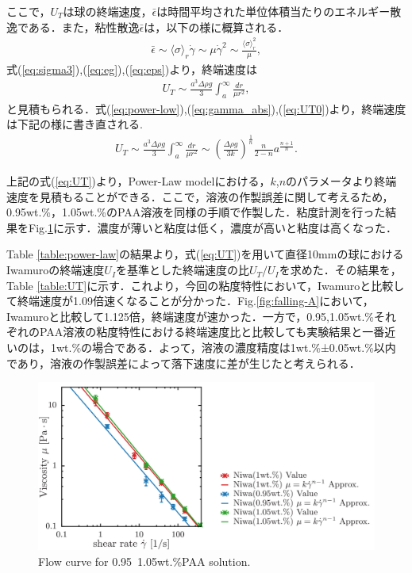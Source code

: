 ここで，$U_T$は球の終端速度，$\bar{\epsilon}$は時間平均された単位体積当たりのエネルギー散逸である．また，粘性散逸$\bar{\epsilon}$は，以下の様に概算される．
\begin{eqnarray}
    \bar{\epsilon} \sim \langle\sigma\rangle_r\dot{\gamma} \sim \mu \dot{\gamma}^2 \sim \frac{\langle\sigma\rangle_r^2}{\mu} ,
    \label{eq:eps}
\end{eqnarray}
式(\ref{eq:sigma3}),(\ref{eq:eg}),(\ref{eq:eps})より，終端速度は
\begin{eqnarray}
    U_T \sim \frac{a^3\Delta\rho g}{3}\int_a^\infty\frac{dr}{\mu r^2} ,
    \label{eq:UT0}
\end{eqnarray}
と見積もられる．式(\ref{eq:power-low}),(\ref{eq:gamma_abs}),(\ref{eq:UT0})より，終端速度は下記の様に書き直される.
\begin{eqnarray}
    U_T \sim \frac{a^3\Delta\rho g}{3}  \int^{\infty}_{a} \frac{dr}{\mu r^2} \sim \left(\frac{\Delta \rho g}{3k}\right)^{\frac{1}{n}}\frac{n}{2-n}a^{\frac{n+1}{n}} .
    \label{eq:UT}
\end{eqnarray}

上記の式(\ref{eq:UT})より，Power-Law modelにおける，$k$,$n$のパラメータより終端速度を見積もることができる．ここで，溶液の作製誤差に関して考えるため，0.95wt.\%，1.05wt.\%のPAA溶液を同様の手順で作製した．粘度計測を行った結果をFig.\ref{fig:95-105}に示す．濃度が薄いと粘度は低く，濃度が高いと粘度は高くなった．

Table \ref{table:power-law}の結果より，式(\ref{eq:UT})を用いて直径10mmの球におけるIwamuro\cite{ref:8}の終端速度$U_I$を基準とした終端速度の比$U_T/U_{I}$を求めた．その結果を，Table \ref{table:UT}に示す．これより，今回の粘度特性において，Iwamuro\cite{ref:8}と比較して終端速度が1.09倍速くなることが分かった．Fig.\ref{fig:falling-A}において，Iwamuro\cite{ref:8}と比較して1.125倍，終端速度が速かった．一方で，0.95,1.05wt.\%それぞれのPAA溶液の粘度特性における終端速度比と比較しても実験結果と一番近いのは，1wt.\%の場合である．よって，溶液の濃度精度は1wt.\%±0.05wt.\%以内であり，溶液の作製誤差によって落下速度に差が生じたと考えられる．

\begin{figure}[ht]
    \includegraphics[width=15cm,clip]{5-Discussion/95-105.png}
    \caption{Flow curve for 0.95~1.05wt.\%PAA solution.}
    \label{fig:95-105}
\end{figure}

